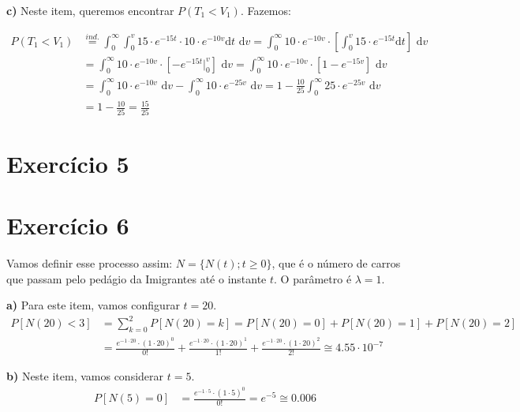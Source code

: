 \documentclass[12pt]{article}
\begin{document}
	\textbf{c)} Neste item, queremos encontrar $P(T_1 < V_1)$. Fazemos:
	
	\begin{equation*}
		\begin{split}
			P(T_1 < V_1) & \stackrel{ind.}{=} \int_{0}^{\infty} \int_{0}^{v} 15\cdot e^{-15t} \cdot 10\cdot e^{-10v} \text{d}t \text{ d}v = \int_{0}^{\infty} 10\cdot e^{-10v} \cdot \left[\int_{0}^{v} 15\cdot e^{-15t} \text{d}t\right] \text{ d}v \\
			& = \int_{0}^{\infty} 10\cdot e^{-10v} \cdot \left[-e^{-15t} \rvert_{0}^{v}\right] \text{ d}v = \int_{0}^{\infty} 10\cdot e^{-10v} \cdot \left[1 - e^{-15v} \right] \text{ d}v \\
			& = \int_{0}^{\infty} 10\cdot e^{-10v} \text{ d}v - \int_{0}^{\infty} 10\cdot e^{-25v} \text{ d}v = 1 - \frac{10}{25} \int_{0}^{\infty} 25\cdot e^{-25v} \text{ d}v \\
			& = 1 - \frac{10}{25} = \frac{15}{25}
		\end{split}
	\end{equation*}    
	 
	 \section*{Exercício 5}
	 
	 \section*{Exercício 6}
	 
	 Vamos definir esse processo assim: $ N = \{N(t); t\geq0\} $, que é o número de carros que passam pelo pedágio da Imigrantes até o instante $ t $. O parâmetro é $ \lambda = 1 $.
	 
	 \textbf{a)} Para este item, vamos configurar $ t = 20 $.
	 \begin{equation*}
	 	\begin{split}
		 	P[N(20) < 3] & = \sum_{k=0}^{2} P[N(20) = k] = P[N(20) = 0] + P[N(20) = 1] + P[N(20) = 2] \\
		 	& = \frac{e^{-1\cdot 20}\cdot(1\cdot 20)^0}{0!} + \frac{e^{-1\cdot 20}\cdot(1\cdot 20)^1}{1!} + \frac{e^{-1\cdot 20}\cdot(1\cdot 20)^2}{2!} \cong 4.55 \cdot 10^{-7}
	 	\end{split}
	 \end{equation*}
	 
	 \textbf{b)} Neste item, vamos considerar $ t = 5 $.
	 \begin{equation*}
		 \begin{split}
			 P[N(5) = 0] & = \frac{e^{-1\cdot 5}\cdot(1\cdot 5)^0}{0!} = e^{-5} \cong 0.006
		 \end{split}
	 \end{equation*}
	 
\end{document}
